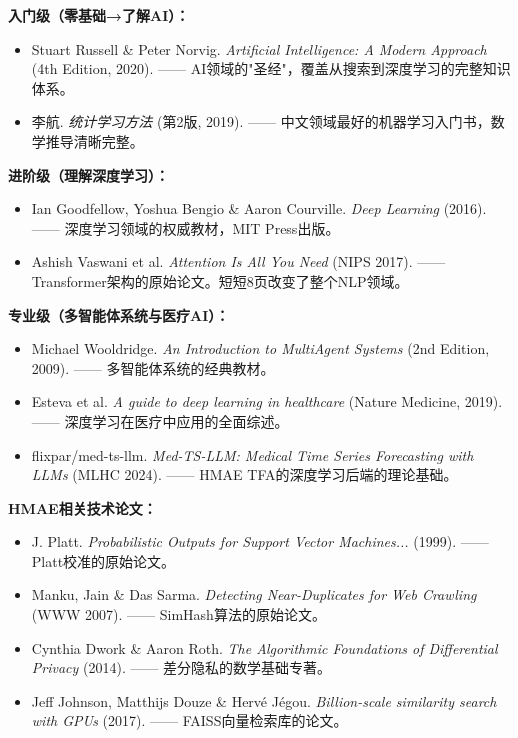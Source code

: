 \documentclass[11pt,a4paper]{ctexart}
\begin{document}
\textbf{入门级（零基础→了解AI）：}
\begin{itemize}[nosep]
\item Stuart Russell \& Peter Norvig. \textit{Artificial Intelligence: A Modern Approach} (4th Edition, 2020). —— AI领域的"圣经"，覆盖从搜索到深度学习的完整知识体系。
\item 李航. \textit{统计学习方法} (第2版, 2019). —— 中文领域最好的机器学习入门书，数学推导清晰完整。
\end{itemize}

\textbf{进阶级（理解深度学习）：}
\begin{itemize}[nosep]
\item Ian Goodfellow, Yoshua Bengio \& Aaron Courville. \textit{Deep Learning} (2016). —— 深度学习领域的权威教材，MIT Press出版。
\item Ashish Vaswani et al. \textit{Attention Is All You Need} (NIPS 2017). —— Transformer架构的原始论文。短短8页改变了整个NLP领域。
\end{itemize}

\textbf{专业级（多智能体系统与医疗AI）：}
\begin{itemize}[nosep]
\item Michael Wooldridge. \textit{An Introduction to MultiAgent Systems} (2nd Edition, 2009). —— 多智能体系统的经典教材。
\item Esteva et al. \textit{A guide to deep learning in healthcare} (Nature Medicine, 2019). —— 深度学习在医疗中应用的全面综述。
\item flixpar/med-ts-llm. \textit{Med-TS-LLM: Medical Time Series Forecasting with LLMs} (MLHC 2024). —— HMAE TFA的深度学习后端的理论基础。
\end{itemize}

\textbf{HMAE相关技术论文：}
\begin{itemize}[nosep]
\item J. Platt. \textit{Probabilistic Outputs for Support Vector Machines...} (1999). —— Platt校准的原始论文。
\item Manku, Jain \& Das Sarma. \textit{Detecting Near-Duplicates for Web Crawling} (WWW 2007). —— SimHash算法的原始论文。
\item Cynthia Dwork \& Aaron Roth. \textit{The Algorithmic Foundations of Differential Privacy} (2014). —— 差分隐私的数学基础专著。
\item Jeff Johnson, Matthijs Douze \& Hervé Jégou. \textit{Billion-scale similarity search with GPUs} (2017). —— FAISS向量检索库的论文。
\end{itemize}
\end{document}
